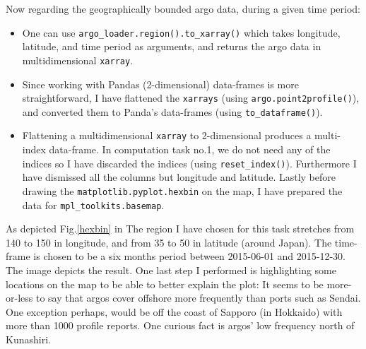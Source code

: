 \documentclass[12pt]{article}
\begin{document}
Now regarding the geographically bounded argo data, 
during a given time period:
 \begin{itemize}
     \item One can use \verb|argo_loader.region().to_xarray()| which takes longitude, latitude, and time period as arguments, and 
     returns the argo data in multidimensional \verb|xarray|.
     \item Since working
     with Pandas (2-dimensional) data-frames is more straightforward, 
     I have flattened the \verb|xarrays| 
     (using \verb|argo.point2profile()|),
     and converted them to Panda's data-frames 
     (using \verb|to_dataframe()|).
     \item Flattening a multidimensional \verb|xarray| to 
     2-dimensional produces a multi-index data-frame. 
     In computation task no.1, 
     we do not need any of the indices so I have discarded 
     the indices (using \verb|reset_index()|). Furthermore I 
     have dismissed all
     the columns but longitude and latitude. 
     Lastly before 
     drawing the \verb|matplotlib.pyplot.hexbin| on the map, I have
     prepared the data for \verb|mpl_toolkits.basemap|.
 \end{itemize}

 As depicted Fig.\ref{hexbin} in The region I have chosen for 
 this task stretches from 140 to 150 
 in longitude, and from 35 to 50 in latitude (around Japan). 
 The time-frame is chosen to be a six months period between 
 2015-06-01 and 2015-12-30. The image depicts the result. One
 last step I performed is highlighting some locations on the map 
 to be able to better explain the plot: It seems to be
 more-or-less to say that argos cover offshore more frequently 
 than ports such as Sendai. One exception perhaps, would be
 off the coast of Sapporo (in Hokkaido) with more than 1000 profile 
 reports. One curious fact is argos' low frequency north of Kunashiri.    
\end{document}
